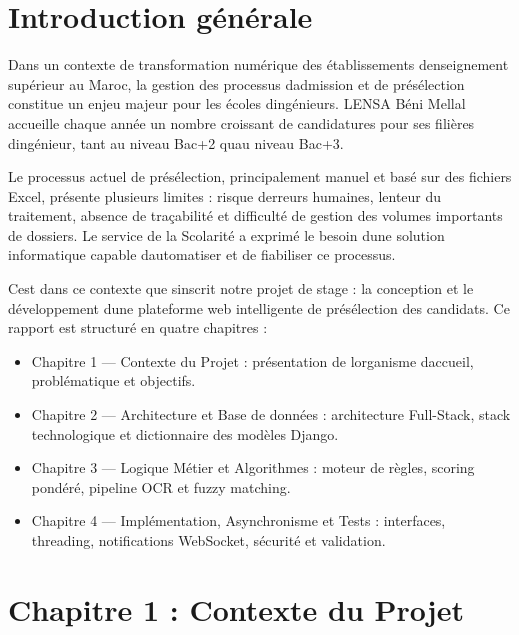 \documentclass[
]{article}
\begin{document}
\hypertarget{introduction-guxe9nuxe9rale}{%
\section{Introduction générale}\label{introduction-guxe9nuxe9rale}}

Dans un contexte de transformation numérique des établissements
d\textquotesingle enseignement supérieur au Maroc, la gestion des
processus d\textquotesingle admission et de présélection constitue un
enjeu majeur pour les écoles d\textquotesingle ingénieurs.
L\textquotesingle ENSA Béni Mellal accueille chaque année un nombre
croissant de candidatures pour ses filières d\textquotesingle ingénieur,
tant au niveau Bac+2 qu\textquotesingle au niveau Bac+3.

Le processus actuel de présélection, principalement manuel et basé sur
des fichiers Excel, présente plusieurs limites : risque
d\textquotesingle erreurs humaines, lenteur du traitement, absence de
traçabilité et difficulté de gestion des volumes importants de dossiers.
Le service de la Scolarité a exprimé le besoin d\textquotesingle une
solution informatique capable d\textquotesingle automatiser et de
fiabiliser ce processus.

C\textquotesingle est dans ce contexte que s\textquotesingle inscrit
notre projet de stage : la conception et le développement
d\textquotesingle une plateforme web intelligente de présélection des
candidats. Ce rapport est structuré en quatre chapitres :

\begin{itemize}
\item
  Chapitre 1 --- Contexte du Projet : présentation de
  l\textquotesingle organisme d\textquotesingle accueil, problématique
  et objectifs.
\item
  Chapitre 2 --- Architecture et Base de données : architecture
  Full-Stack, stack technologique et dictionnaire des modèles Django.
\item
  Chapitre 3 --- Logique Métier et Algorithmes : moteur de règles,
  scoring pondéré, pipeline OCR et fuzzy matching.
\item
  Chapitre 4 --- Implémentation, Asynchronisme et Tests : interfaces,
  threading, notifications WebSocket, sécurité et validation.
\end{itemize}

\hypertarget{chapitre-1-contexte-du-projet}{%
\section{Chapitre 1 : Contexte du
Projet}\label{chapitre-1-contexte-du-projet}}
\end{document}
